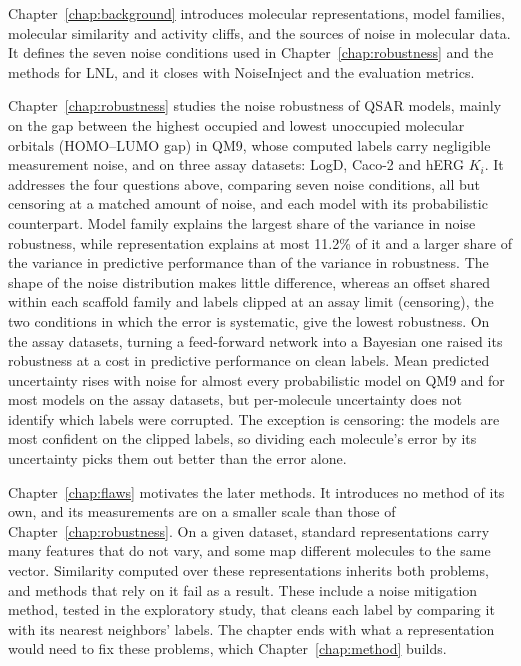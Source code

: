 Chapter~\ref{chap:background} introduces molecular representations, model families, molecular similarity and activity cliffs, and the sources of noise in molecular data. It defines the seven noise conditions used in Chapter~\ref{chap:robustness} and the methods for LNL, and it closes with NoiseInject and the evaluation metrics.

Chapter~\ref{chap:robustness} studies the noise robustness of QSAR models, mainly on the gap between the highest occupied and lowest unoccupied molecular orbitals (HOMO--LUMO gap) in QM9, whose computed labels carry negligible measurement noise, and on three assay datasets: LogD, Caco-2 and hERG $K_i$. It addresses the four questions above, comparing seven noise conditions, all but censoring at a matched amount of noise, and each model with its probabilistic counterpart. Model family explains the largest share of the variance in noise robustness, while representation explains at most 11.2\% of it and a larger share of the variance in predictive performance than of the variance in robustness. The shape of the noise distribution makes little difference, whereas an offset shared within each scaffold family and labels clipped at an assay limit (censoring), the two conditions in which the error is systematic, give the lowest robustness. On the assay datasets, turning a feed-forward network into a Bayesian one raised its robustness at a cost in predictive performance on clean labels. Mean predicted uncertainty rises with noise for almost every probabilistic model on QM9 and for most models on the assay datasets, but per-molecule uncertainty does not identify which labels were corrupted. The exception is censoring: the models are most confident on the clipped labels, so dividing each molecule's error by its uncertainty picks them out better than the error alone.

Chapter~\ref{chap:flaws} motivates the later methods. It introduces no method of its own, and its measurements are on a smaller scale than those of Chapter~\ref{chap:robustness}. On a given dataset, standard representations carry many features that do not vary, and some map different molecules to the same vector. Similarity computed over these representations inherits both problems, and methods that rely on it fail as a result. These include a noise mitigation method, tested in the exploratory study, that cleans each label by comparing it with its nearest neighbors' labels. The chapter ends with what a representation would need to fix these problems, which Chapter~\ref{chap:method} builds.

